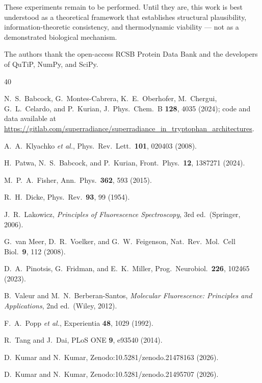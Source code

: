 \documentclass[aps,pre,twocolumn,showpacs,superscriptaddress]{revtex4-2}
\begin{document}
These experiments remain to be performed. Until they are, this work is best understood as a theoretical framework that establishes structural plausibility, information-theoretic consistency, and thermodynamic viability --- not as a demonstrated biological mechanism.

\begin{acknowledgments}
The authors thank the open-access RCSB Protein Data Bank and the developers of QuTiP, NumPy, and SciPy.
\end{acknowledgments}

\FloatBarrier
\begin{thebibliography}{40}


 N.\ S.\ Babcock, G.\ Montes-Cabrera, K.\ E.\ Oberhofer, M.\ Chergui, G.\ L.\ Celardo, and P.\ Kurian, J.\ Phys.\ Chem.\ B \textbf{128}, 4035 (2024); code and data available at \url{https://gitlab.com/superradiance/superradiance_in_tryptophan_architectures}.

 A.\ A.\ Klyachko \textit{et al.}, Phys.\ Rev.\ Lett.\ \textbf{101}, 020403 (2008).

 H.\ Patwa, N.\ S.\ Babcock, and P.\ Kurian, Front.\ Phys.\ \textbf{12}, 1387271 (2024).

 M.\ P.\ A.\ Fisher, Ann.\ Phys.\ \textbf{362}, 593 (2015).

 R.\ H.\ Dicke, Phys.\ Rev.\ \textbf{93}, 99 (1954).

 J.\ R.\ Lakowicz, \textit{Principles of Fluorescence Spectroscopy}, 3rd ed.\ (Springer, 2006).

 G.\ van Meer, D.\ R.\ Voelker, and G.\ W.\ Feigenson, Nat.\ Rev.\ Mol.\ Cell Biol.\ \textbf{9}, 112 (2008).

 D.\ A.\ Pinotsis, G.\ Fridman, and E.\ K.\ Miller, Prog.\ Neurobiol.\ \textbf{226}, 102465 (2023).

 B.\ Valeur and M.\ N.\ Berberan-Santos, \textit{Molecular Fluorescence: Principles and Applications}, 2nd ed.\ (Wiley, 2012).

 F.\ A.\ Popp \textit{et al.}, Experientia \textbf{48}, 1029 (1992).

 R.\ Tang and J.\ Dai, PLoS ONE \textbf{9}, e93540 (2014).


 D.\ Kumar and N.\ Kumar, Zenodo:10.5281/zenodo.21478163 (2026).

 D.\ Kumar and N.\ Kumar, Zenodo:10.5281/zenodo.21495707 (2026).

\end{thebibliography}
\end{document}
